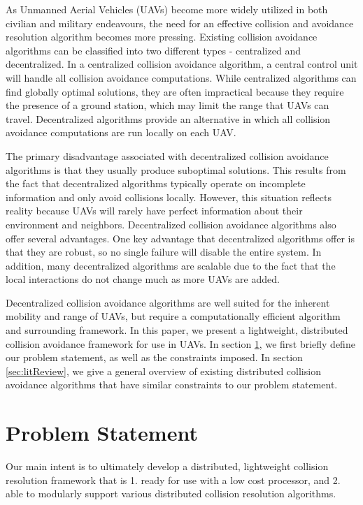\documentclass[conference]{IEEEtran}
\begin{document}
As Unmanned Aerial Vehicles (UAVs) become more widely utilized in both civilian and military endeavours, the need for an effective collision and avoidance resolution algorithm becomes more pressing. 
Existing collision avoidance algorithms can be classified into two different types - centralized and decentralized.  
In a centralized collision avoidance algorithm, a central control unit will handle all collision avoidance computations. 
While centralized algorithms can find globally optimal solutions, they are often impractical because they require the presence of a ground station, which may limit the range that UAVs can travel. Decentralized algorithms provide an alternative in which all collision avoidance computations are run locally on each UAV.

The primary disadvantage associated with decentralized collision avoidance algorithms is that they usually produce suboptimal solutions.  This results from the fact that decentralized algorithms typically operate on incomplete information and only avoid collisions locally. However, this situation reflects reality because UAVs will rarely have perfect information about their environment and neighbors. Decentralized collision avoidance algorithms also offer several advantages. One key advantage that decentralized algorithms offer is that they are robust, so no single failure will disable the entire system. In addition, many decentralized algorithms are scalable due to the fact that the local interactions do not change much as more UAVs are added.

Decentralized collision avoidance algorithms are well suited for the inherent mobility and range of UAVs, but require a computationally efficient algorithm and surrounding framework. In this paper, we present a lightweight, distributed collision avoidance framework for use in UAVs. In section \ref{sec:problem}, we first briefly define our problem statement, as well as the constraints imposed. In section \ref{sec:litReview}, we give a general overview of existing distributed collision avoidance algorithms that have similar constraints to our problem statement. 

\section{Problem Statement}
\label{sec:problem}

Our main intent is to ultimately develop a distributed, lightweight collision resolution framework  that is 1. ready for use with a low cost processor, and 2. able to modularly support various distributed collision resolution algorithms. 
\end{document}
